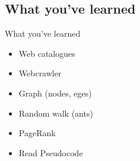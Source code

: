 \subsection{What you've learned}
\begin{frame}{What you've learned}
    \begin{itemize}
        \item Web catalogues
        \item Webcrawler
        \item Graph (nodes, eges)
        \item Random walk (ants)
        \item PageRank
        \item Read Pseudocode
    \end{itemize}
\end{frame}
